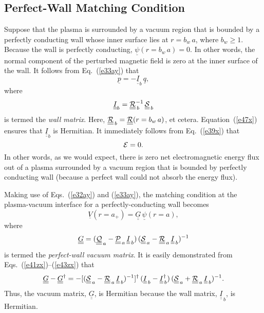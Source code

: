 \documentclass[12pt,prb,aps]{revtex4-1}
\begin{document}
\subsection{Perfect-Wall Matching Condition}
Suppose that the plasma is surrounded by a vacuum region that is bounded by a perfectly conducting wall whose inner surface lies at $r=b_w\,a$, where $b_w\geq 1$. 
Because the wall is perfectly conducting, 
$\underline{\psi}(r=b_w\,a)=0$.\cite{gs1}
In other words, the normal component of the perturbed magnetic field is zero at the inner surface of the wall. 
It follows from Eq.~(\ref{e33ay}) that
\begin{equation}
\underline{p} =- \underline{\underline{I}}_b\,\underline{q},
\end{equation}
where
\begin{equation}
 \underline{\underline{I}}_b= \underline{\underline{\cal R}}_{\,b}^{-1}\,\underline{\underline{\cal S}}_{\,b}
 \end{equation}
 is termed the {\em wall matrix}.
 Here, $\underline{\underline{\cal R}}_{\,b}= \underline{\underline{\cal R}}(r=b_w\,a)$, et cetera. Equation~(\ref{e47x}) ensures that $ \underline{\underline{I}}_b$
 is Hermitian. It immediately follows from Eq.~(\ref{e39x}) that
 \begin{equation}\label{ezero1}
 {\cal E}=0.
 \end{equation}
  In other words, as we would expect, there is zero net electromagnetic energy flux out of  a plasma
 surrounded by a vacuum region that is bounded by perfectly conducting wall (because a perfect wall could not absorb the energy flux). 
 
  Making use of Eqs.~(\ref{e32ay}) and (\ref{e33ay}),  the matching condition at the plasma-vacuum interface  for a perfectly-conducting wall becomes 
 \begin{equation}\label{gdef}
 \underline{V}(r=a_+)= \underline{\underline{G}}\,\underline{\psi}(r=a),
 \end{equation}
 where 
 \begin{equation}
 \underline{\underline{G}}= (\underline{\underline{\cal Q}}_{\,a}-\underline{\underline{\cal P}}_{\,a}\,\underline{\underline{I}}_{\,b})\,(\underline{\underline{\cal S}}_{\,a}-\underline{\underline{\cal R}}_{\,a}\,\underline{\underline{I}}_{\,b})^{-1}
 \end{equation}
 is termed the {\em perfect-wall vacuum matrix}.
It is easily demonstrated from  Eqs.~(\ref{e41zx})--(\ref{e43zx})  that
 \begin{equation}\label{e53xx}
 \underline{\underline{G}}-\underline{\underline{G}}^\dag =- [(\underline{\underline{\cal S}}_{\,a}-\underline{\underline{\cal R}}_{\,a}\,\underline{\underline{I}}_{\,b})^{-1}]^{\dag}\,(\underline{\underline{I}}_{\,b} -\underline{\underline{I}}^\dag_{\,b})\,  (\underline{\underline{\cal S}}_{\,a}+\underline{\underline{\cal R}}_{\,a}\,\underline{\underline{I}}_{\,b})^{-1}.
\end{equation}
Thus,  the vacuum matrix, $\underline{\underline{G}}$, is Hermitian because  the wall matrix, $\underline{\underline{I}}_{\,b}$, is Hermitian. 
 
\end{document}
